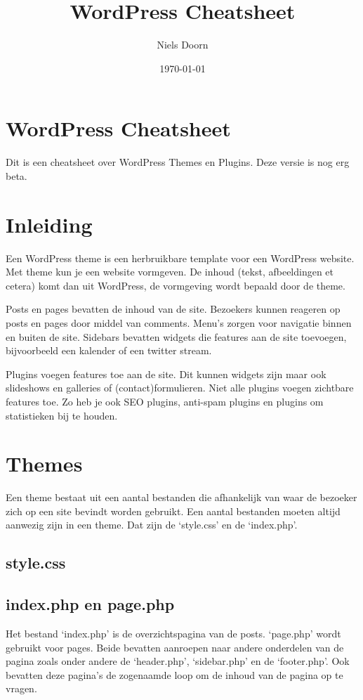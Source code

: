 \documentclass[8pt,pagesize,footinclude=false,headinclude=false]{scrartcl}
\title{WordPress Cheatsheet}
\author{Niels Doorn}
\date{\today}
\begin{document}
\ifpdf
{}
\else
{}
\fi

\begin{multicols*}{4}

\section*{WordPress Cheatsheet}
Dit is een cheatsheet over WordPress Themes en Plugins. Deze versie is nog erg beta.

\section*{Inleiding}
Een WordPress theme is een herbruikbare template voor een WordPress website. Met theme kun je een website vormgeven. De inhoud (tekst, afbeeldingen et cetera) komt dan uit WordPress, de vormgeving wordt bepaald door de theme.

Posts en pages bevatten de inhoud van de site. Bezoekers kunnen reageren op posts en pages door middel van comments. Menu's zorgen voor navigatie binnen en buiten de site. Sidebars bevatten widgets die features aan de site toevoegen, bijvoorbeeld een kalender of een twitter stream.

Plugins voegen features toe aan de site. Dit kunnen widgets zijn maar ook slideshows en galleries of (contact)formulieren. Niet alle plugins voegen zichtbare features toe. Zo heb je ook SEO plugins, anti-spam plugins en plugins om statistieken bij te houden.

\section*{Themes}
Een theme bestaat uit een aantal bestanden die afhankelijk van waar de bezoeker zich op een site bevindt worden gebruikt. Een aantal bestanden moeten altijd aanwezig zijn in een theme. Dat zijn de `style.css' en de `index.php'.
\subsection*{style.css}



\subsection*{index.php en page.php}
Het bestand `index.php' is de overzichtspagina van de posts. `page.php' wordt gebruikt voor pages. Beide bevatten aanroepen naar andere onderdelen van de pagina zoals onder andere de `header.php', `sidebar.php' en de `footer.php'. Ook bevatten deze pagina's de zogenaamde loop om de inhoud van de pagina op te vragen.


\end{multicols*}
\end{document}
